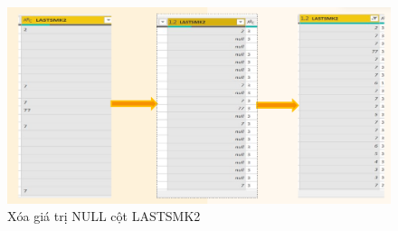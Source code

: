             \begin{figure}[!h]
                \begin{center}
                \includegraphics[scale = 0.7]{HONG/1.png}
              \caption{Xóa giá trị NULL cột LASTSMK2}
         
\end{center}
   \end{figure}



